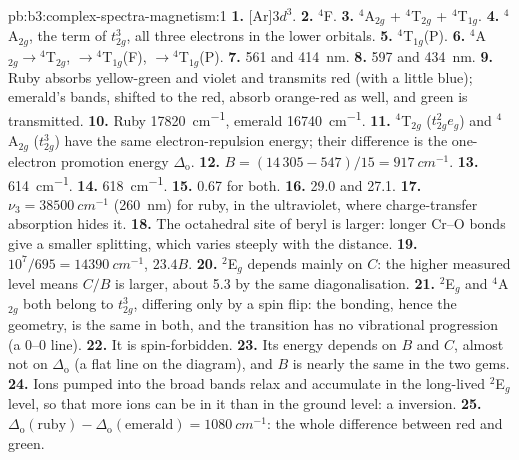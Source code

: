 \begin{solution}{pb:b3:complex-spectra-magnetism:1}
\textbf{1.} [Ar]$3d^3$.
\textbf{2.} $^4$F.
\textbf{3.} $^4$A$_{2g}$ + $^4$T$_{2g}$ + $^4$T$_{1g}$.
\textbf{4.} $^4$A$_{2g}$, the term of $t_{2g}^3$, all three electrons in the lower orbitals.
\textbf{5.} $^4$T$_{1g}$(P).
\textbf{6.} $^4$A$_{2g}\to{}^4$T$_{2g}$, $\to{}^4$T$_{1g}$(F), $\to{}^4$T$_{1g}$(P).
\textbf{7.} 561 and \qty{414}{nm}.
\textbf{8.} 597 and \qty{434}{nm}.
\textbf{9.} Ruby absorbs yellow-green and violet and transmits red (with a little
blue); emerald's bands, shifted to the red, absorb orange-red as well, and green
is transmitted.
\textbf{10.} Ruby \qty{17820}{cm^{-1}}, emerald \qty{16740}{cm^{-1}}.
\textbf{11.} $^4$T$_{2g}$ ($t_{2g}^2e_g$) and $^4$A$_{2g}$ ($t_{2g}^3$) have the same electron-repulsion energy; their
difference is the one-electron promotion energy $\Delta_{\mathrm o}$.
\textbf{12.} $B = (14\,305 - 547)/15 = \qty{917}{cm^{-1}}$.
\textbf{13.} \qty{614}{cm^{-1}}.
\textbf{14.} \qty{618}{cm^{-1}}.
\textbf{15.} 0.67 for both.
\textbf{16.} 29.0 and 27.1.
\textbf{17.} $\nu_3 = \qty{38500}{cm^{-1}}$ (\qty{260}{nm}) for ruby, in the ultraviolet, where charge-transfer
absorption hides it.
\textbf{18.} The octahedral site of beryl is larger: longer Cr--O bonds give a smaller
splitting, which varies steeply with the distance.
\textbf{19.} $10^7/695 = \qty{14390}{cm^{-1}}$, $23.4B$.
\textbf{20.} $^2$E$_g$ depends mainly on $C$: the higher measured level means $C/B$ is larger,
about 5.3 by the same diagonalisation.
\textbf{21.} $^2$E$_g$ and $^4$A$_{2g}$ both belong to $t_{2g}^3$, differing only by a spin flip: the bonding,
hence the geometry, is the same in both, and the transition has no vibrational
progression (a 0--0 line).
\textbf{22.} It is spin-forbidden.
\textbf{23.} Its energy depends on $B$ and $C$, almost not on $\Delta_{\mathrm o}$ (a flat line on the diagram),
and $B$ is nearly the same in the two gems.
\textbf{24.} Ions pumped into the broad bands relax and accumulate in the long-lived
$^2$E$_g$ level, so that more ions can be in it than in the ground level: a 
inversion.
\textbf{25.} \textbf{$\Delta_{\mathrm o}(\text{ruby}) - \Delta_{\mathrm o}(\text{emerald}) = \qty{1080}{cm^{-1}}$}: the whole difference between red and
green.
\end{solution}
